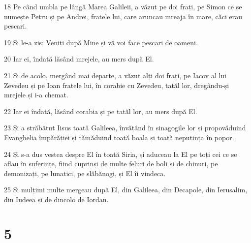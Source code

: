 \par 18 Pe când umbla pe lângă Marea Galileii, a văzut pe doi frați, pe Simon ce se numește Petru și pe Andrei, fratele lui, care aruncau mreaja în mare, căci erau pescari.
\par 19 Și le-a zis: Veniți după Mine și vă voi face pescari de oameni.
\par 20 Iar ei, îndată lăsând mrejele, au mers după El.
\par 21 Și de acolo, mergând mai departe, a văzut alți doi frați, pe Iacov al lui Zevedeu și pe Ioan fratele lui, în corabie cu Zevedeu, tatăl lor, dregându-și mrejele și i-a chemat.
\par 22 Iar ei îndată, lăsând corabia și pe tatăl lor, au mers după El.
\par 23 Și a străbătut Iisus toată Galileea, învățând în sinagogile lor și propovăduind Evanghelia împărăției și tămăduind toată boala și toată neputința în popor.
\par 24 Și s-a dus vestea despre El în toată Siria, și aduceau la El pe toți cei ce se aflau în suferințe, fiind cuprinși de multe feluri de boli și de chinuri, pe demonizați, pe lunatici, pe slăbănogi, și El îi vindeca.
\par 25 Și mulțimi multe mergeau după El, din Galileea, din Decapole, din Ierusalim, din Iudeea și de dincolo de Iordan.

\chapter{5}

